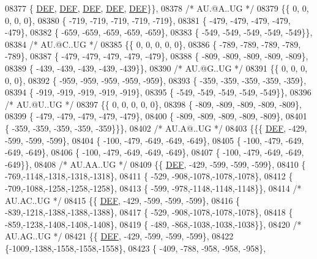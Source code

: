 \begin{DoxyCode}
08377 \{  \mbox{\hyperlink{1_88_84__epars_8h_a397419fc12b37ed479c8abb9d444d843}{DEF}},  \mbox{\hyperlink{1_88_84__epars_8h_a397419fc12b37ed479c8abb9d444d843}{DEF}},  \mbox{\hyperlink{1_88_84__epars_8h_a397419fc12b37ed479c8abb9d444d843}{DEF}},  \mbox{\hyperlink{1_88_84__epars_8h_a397419fc12b37ed479c8abb9d444d843}{DEF}},  \mbox{\hyperlink{1_88_84__epars_8h_a397419fc12b37ed479c8abb9d444d843}{DEF}}\}\},
08378 \textcolor{comment}{/* AU.@A..UG */}
08379 \{\{    0,    0,    0,    0,    0\},
08380 \{ -719, -719, -719, -719, -719\},
08381 \{ -479, -479, -479, -479, -479\},
08382 \{ -659, -659, -659, -659, -659\},
08383 \{ -549, -549, -549, -549, -549\}\},
08384 \textcolor{comment}{/* AU.@C..UG */}
08385 \{\{    0,    0,    0,    0,    0\},
08386 \{ -789, -789, -789, -789, -789\},
08387 \{ -479, -479, -479, -479, -479\},
08388 \{ -809, -809, -809, -809, -809\},
08389 \{ -439, -439, -439, -439, -439\}\},
08390 \textcolor{comment}{/* AU.@G..UG */}
08391 \{\{    0,    0,    0,    0,    0\},
08392 \{ -959, -959, -959, -959, -959\},
08393 \{ -359, -359, -359, -359, -359\},
08394 \{ -919, -919, -919, -919, -919\},
08395 \{ -549, -549, -549, -549, -549\}\},
08396 \textcolor{comment}{/* AU.@U..UG */}
08397 \{\{    0,    0,    0,    0,    0\},
08398 \{ -809, -809, -809, -809, -809\},
08399 \{ -479, -479, -479, -479, -479\},
08400 \{ -809, -809, -809, -809, -809\},
08401 \{ -359, -359, -359, -359, -359\}\}\},
08402 \textcolor{comment}{/* AU.A@..UG */}
08403 \{\{\{  \mbox{\hyperlink{1_88_84__epars_8h_a397419fc12b37ed479c8abb9d444d843}{DEF}}, -429, -599, -599, -599\},
08404 \{ -100, -479, -649, -649, -649\},
08405 \{ -100, -479, -649, -649, -649\},
08406 \{ -100, -479, -649, -649, -649\},
08407 \{ -100, -479, -649, -649, -649\}\},
08408 \textcolor{comment}{/* AU.AA..UG */}
08409 \{\{  \mbox{\hyperlink{1_88_84__epars_8h_a397419fc12b37ed479c8abb9d444d843}{DEF}}, -429, -599, -599, -599\},
08410 \{ -769,-1148,-1318,-1318,-1318\},
08411 \{ -529, -908,-1078,-1078,-1078\},
08412 \{ -709,-1088,-1258,-1258,-1258\},
08413 \{ -599, -978,-1148,-1148,-1148\}\},
08414 \textcolor{comment}{/* AU.AC..UG */}
08415 \{\{  \mbox{\hyperlink{1_88_84__epars_8h_a397419fc12b37ed479c8abb9d444d843}{DEF}}, -429, -599, -599, -599\},
08416 \{ -839,-1218,-1388,-1388,-1388\},
08417 \{ -529, -908,-1078,-1078,-1078\},
08418 \{ -859,-1238,-1408,-1408,-1408\},
08419 \{ -489, -868,-1038,-1038,-1038\}\},
08420 \textcolor{comment}{/* AU.AG..UG */}
08421 \{\{  \mbox{\hyperlink{1_88_84__epars_8h_a397419fc12b37ed479c8abb9d444d843}{DEF}}, -429, -599, -599, -599\},
08422 \{-1009,-1388,-1558,-1558,-1558\},
08423 \{ -409, -788, -958, -958, -958\},

\end{DoxyCode}
